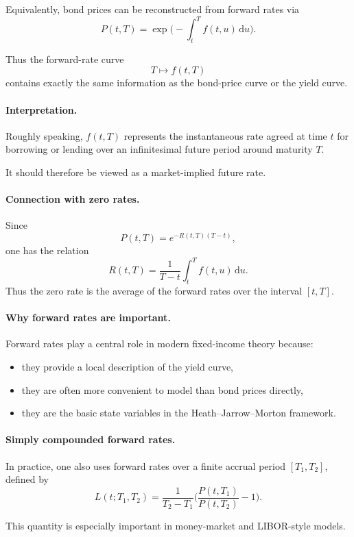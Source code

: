 \documentclass[11pt]{article}
\theoremstyle{plain}
\theoremstyle{definition}
\theoremstyle{remark}
\begin{document}
Equivalently, bond prices can be reconstructed from forward rates via
\[
\boxed{
P(t,T)=\exp\!\Big(-\int_t^T f(t,u)\,\mathrm{d}u\Big).
}
\]

Thus the forward-rate curve
\[
T\longmapsto f(t,T)
\]
contains exactly the same information as the bond-price curve or the
yield curve.

\paragraph{Interpretation.}
Roughly speaking, \(f(t,T)\) represents the instantaneous rate agreed at
time \(t\) for borrowing or lending over an infinitesimal future period
around maturity \(T\).

It should therefore be viewed as a market-implied future rate.

\paragraph{Connection with zero rates.}
Since
\[
P(t,T)=e^{-R(t,T)(T-t)},
\]
one has the relation
\[
R(t,T)
=
\frac{1}{T-t}\int_t^T f(t,u)\,\mathrm{d}u.
\]
Thus the zero rate is the average of the forward rates over the interval
\([t,T]\).

\paragraph{Why forward rates are important.}
Forward rates play a central role in modern fixed-income theory because:
\begin{itemize}[leftmargin=1.4em]
    \item they provide a local description of the yield curve,
    \item they are often more convenient to model than bond prices
    directly,
    \item they are the basic state variables in the
    Heath--Jarrow--Morton framework.
\end{itemize}

\paragraph{Simply compounded forward rates.}
In practice, one also uses forward rates over a finite accrual period
\([T_1,T_2]\), defined by
\[
\boxed{
L(t;T_1,T_2)
=
\frac{1}{T_2-T_1}
\Big(
\frac{P(t,T_1)}{P(t,T_2)}-1
\Big).
}
\]

This quantity is especially important in money-market and LIBOR-style
models.
\end{document}
